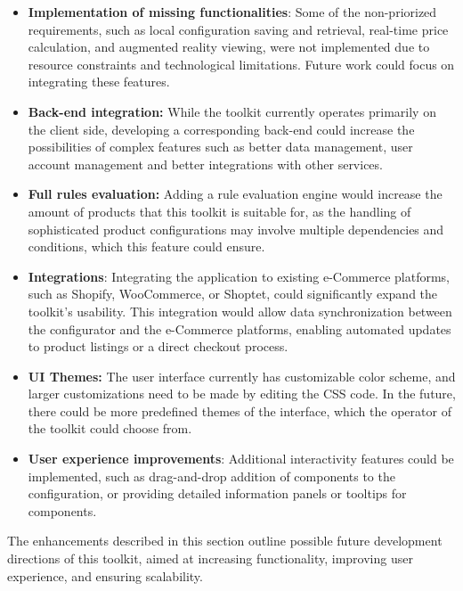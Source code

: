 \begin{itemize}[label=\rectanglebullet]
    \item \textbf{Implementation of missing functionalities}: Some of the non-priorized requirements, such as local configuration saving and retrieval, real-time price calculation, and augmented reality viewing, were not implemented due to resource constraints and technological limitations. Future work could focus on integrating these features.
    \item \textbf{Back-end integration:} While the toolkit currently operates primarily on the client side, developing a corresponding back-end could increase the possibilities of complex features such as better data management, user account management and better integrations with other services.
    \item \textbf{Full rules evaluation:} Adding a rule evaluation engine would increase the amount of products that this toolkit is suitable for, as the handling of sophisticated product configurations may involve multiple dependencies and conditions, which this feature could ensure.
    \item \textbf{Integrations}: Integrating the application to existing e-Commerce platforms, such as Shopify, WooCommerce, or Shoptet, could significantly expand the toolkit's usability. This integration would allow data synchronization between the configurator and the e-Commerce platforms, enabling automated updates to product listings or a direct checkout process.
    \item \textbf{UI Themes:} The user interface currently has customizable color scheme, and larger customizations need to be made by editing the CSS code. In the future, there could be more predefined themes of the interface, which the operator of the toolkit could choose from.
    \item \textbf{User experience improvements}: Additional interactivity features could be implemented, such as drag-and-drop addition of components to the configuration, or providing detailed information panels or tooltips for components.
\end{itemize}

The enhancements described in this section outline possible future development directions of this toolkit, aimed at increasing functionality, improving user experience, and ensuring scalability.

